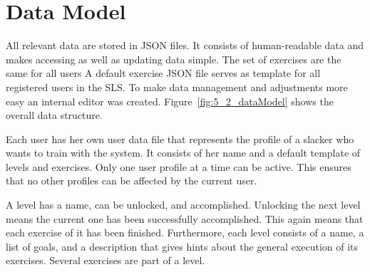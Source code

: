 \section{Data Model}\label{5_2_dataModel}
All relevant data are stored in JSON files.
It consists of human-readable data and makes accessing as well as updating data simple.
The set of exercises are the same for all users
A default exercise JSON file serves as template for all registered users in the SLS.
To make data management and adjustments more easy an internal editor was created.
Figure~\ref{fig:5_2_dataModel} shows the overall data structure.

Each user has her own user data file that represents the profile of a slacker who wants to train with the system.
It consists of her name and a default template of levels and exercises.
Only one user profile at a time can be active.
This ensures that no other profiles can be affected by the current user.

A level has a name, can be unlocked, and accomplished. Unlocking the next level means the current one has been successfully accomplished. This again means that each exercise of it has been finished. Furthermore, each level consists of a name, a list of goals, and a description that gives hints about the general execution of its exercises.
Several exercises are part of a level.

